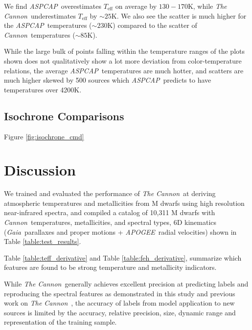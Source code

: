 \documentclass[modern]{aastex62}
\newcommand{\apogee}{\textsl{APOGEE}}
\newcommand{\thecannon}{\textsl{The Cannon}}
\newcommand{\cannon}{\textsl{Cannon}}
\newcommand{\aspcap}{\textsl{ASPCAP}}
\newcommand{\gaia}{\textsl{Gaia}}
\newcommand{\teff}{T_{\mathrm{eff}}}
\begin{document}
We find \aspcap\ overestimates $\teff$ on average by $130-170$K, while \thecannon\ underestimates $\teff$ by $\sim25$K. We also see the scatter is much higher for the \aspcap\ temperatures ($\sim230$K) compared to the scatter of \cannon\ temperatures ($\sim85$K).

While the large bulk of points falling within the temperature ranges of the plots shown does not qualitatively show a lot more deviation from color-temperature relations, the average \aspcap\ temperatures are much hotter, and scatters are much higher skewed by 500 sources which \aspcap\ predicts to have temperatures over 4200K.

\subsection{Isochrone Comparisons}

Figure \ref{fig:isochrone_cmd}


\section{Discussion} \label{sec:discussion}

We trained and evaluated the performance of \thecannon\ at deriving atmospheric temperatures and metallicities from M dwarfs using high resolution near-infrared spectra, and compiled a catalog of 10,311 M dwarfs with \cannon\ temperatures, metallicities, and spectral types, 6D kinematics (\gaia\ parallaxes and proper motions + \apogee\ radial velocities) shown in Table \ref{table:test_results}.

Table \ref{table:teff_derivative} and Table \ref{table:feh_derivative}, summarize which features are found to be strong temperature and metallicity indicators.

While \thecannon\ generally achieves excellent precision at predicting labels and reproducing the spectral features as demonstrated in this study and previous work on \thecannon\ \citep{Ness:2015,Casey:2016}, the accuracy of labels from model application to new sources is limited by the accuracy, relative precision, size, dynamic range and representation of the training sample.
\end{document}
